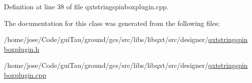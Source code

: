 Definition at line 38 of file qxtstringspinboxplugin.\-cpp.



The documentation for this class was generated from the following files\-:\begin{DoxyCompactItemize}
\item 
/home/jose/\-Code/gui\-Tau/ground/gcs/src/libs/libqxt/src/designer/\hyperlink{qxtstringspinboxplugin_8h}{qxtstringspinboxplugin.\-h}\item 
/home/jose/\-Code/gui\-Tau/ground/gcs/src/libs/libqxt/src/designer/\hyperlink{qxtstringspinboxplugin_8cpp}{qxtstringspinboxplugin.\-cpp}\end{DoxyCompactItemize}
